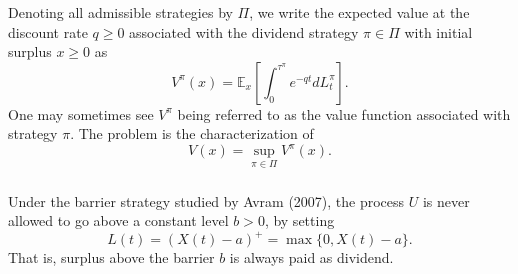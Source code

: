 \documentclass[xcolor=pdftex,dvipsnames,table]{beamer}
\theoremstyle{definition}
\def\lt{\left}
\def\rt{\right}
\def\mbbE{\mathbb{E}}
\begin{document}
\begin{frame}
\frametitle{\insertsectionhead}
Denoting all admissible strategies by $\Pi$, we write the expected value at the discount rate $q\geq 0$ associated with the dividend strategy $\pi \in \Pi$ with initial surplus $x \geq 0$ as
\[
V^{\pi}(x) = \mbbE_x \lt[ \int_0^{\tau^{\pi}} e^{-qt} dL^{\pi}_t \rt].
\]
One may sometimes see $V^{\pi}$ being referred to as the value function associated with strategy $\pi$. The problem is the characterization of 
\[
V(x) = \sup_{\pi \in \Pi} V^{\pi}(x).
\]
\end{frame}


\begin{frame}
\frametitle{\insertsectionhead}
Under the barrier strategy studied by Avram (2007), the  process $U$ is never allowed to go above a constant level $b>0$, by setting
\[ L(t) = (X(t)-a)^+ = \max \{0, X(t)-a\}. \]
That is, surplus above the barrier $b$ is always paid as dividend.
\end{frame}
\end{document}
